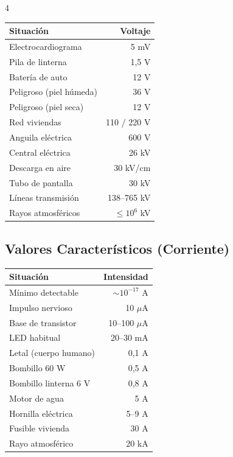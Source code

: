 \documentclass[9pt, landscape, letterpaper]{extarticle}
\begin{document}
\begin{multicols}{4}
  \begin{tablabox}
    \tablacompacta
    \setlength{\tabcolsep}{-6pt}
    \begin{tabular}{@{}p{4.8cm}r@{}}
      \toprule
      Situación               & Voltaje        \\
      \midrule
      Electrocardiograma      & 5 mV           \\
      Pila de linterna        & 1,5 V          \\
      Batería de auto         & 12 V           \\
      Peligroso (piel húmeda) & 36 V           \\
      Peligroso (piel seca)   & 12 V           \\
      Red viviendas           & 110 / 220 V    \\
      Anguila eléctrica       & 600 V          \\
      Central eléctrica       & 26 kV          \\
      Descarga en aire        & 30 kV/cm       \\
      Tubo de pantalla        & 30 kV          \\
      Líneas transmisión      & 138--765 kV    \\
      Rayos atmosféricos      & $\leq 10^6$ kV \\
      \bottomrule
    \end{tabular}
  \end{tablabox}

  \subsection{Valores Característicos (Corriente)}

  \begin{tablabox}
    \tablacompacta
    \setlength{\tabcolsep}{-6pt}
    \begin{tabular}{@{}p{4.8cm}r@{}}
      \toprule
      Situación             & Intensidad        \\
      \midrule
      Mínimo detectable     & $\sim 10^{-17}$ A \\
      Impulso nervioso      & 10 $\mu$A         \\
      Base de transistor    & 10--100 $\mu$A    \\
      LED habitual          & 20--30 mA         \\
      Letal (cuerpo humano) & 0,1 A             \\
      Bombillo 60 W         & 0,5 A             \\
      Bombillo linterna 6 V & 0,8 A             \\
      Motor de agua         & 5 A               \\
      Hornilla eléctrica    & 5--9 A            \\
      Fusible vivienda      & 30 A              \\
      Rayo atmosférico      & 20 kA             \\
      \bottomrule
    \end{tabular}
  \end{tablabox}


\end{multicols}
\end{document}
